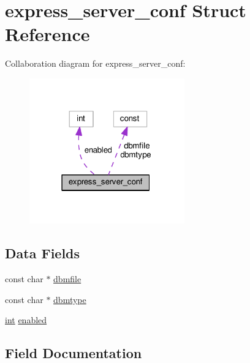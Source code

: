 \hypertarget{structexpress__server__conf}{}\section{express\+\_\+server\+\_\+conf Struct Reference}
\label{structexpress__server__conf}


Collaboration diagram for express\+\_\+server\+\_\+conf\+:
\nopagebreak
\begin{figure}[H]
\begin{center}
\leavevmode
\includegraphics[width=190pt]{structexpress__server__conf__coll__graph}
\end{center}
\end{figure}
\subsection*{Data Fields}
\begin{DoxyCompactItemize}
\item 
const char $\ast$ \hyperlink{structexpress__server__conf_a6032305f736907b56d36cef87db556fe}{dbmfile}
\item 
const char $\ast$ \hyperlink{structexpress__server__conf_a397473336dc8845f24e18a4b600194cf}{dbmtype}
\item 
\hyperlink{pcre_8txt_a42dfa4ff673c82d8efe7144098fbc198}{int} \hyperlink{structexpress__server__conf_a50d47baa75c991e4df686d0b840eadfc}{enabled}
\end{DoxyCompactItemize}


\subsection{Field Documentation}
